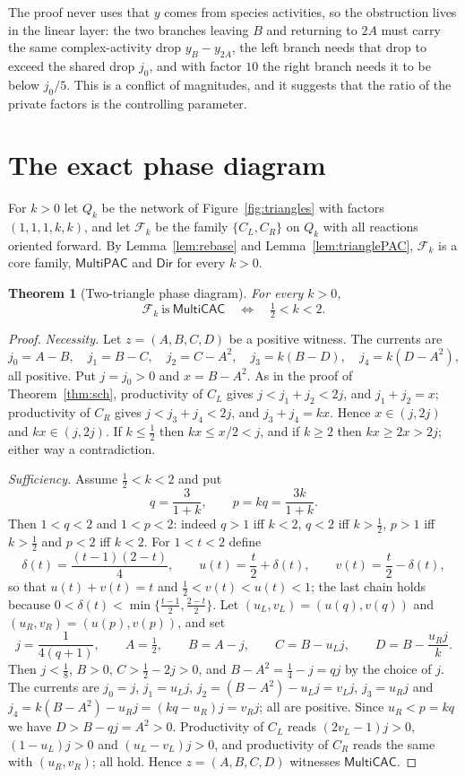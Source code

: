\documentclass[11pt,a4paper]{article}
\theoremstyle{plain}
\newtheorem{theorem}{Theorem}[section]
\theoremstyle{definition}
\theoremstyle{remark}
\newcommand{\cF}{\mathcal{F}}
\newcommand{\MPAC}{\mathsf{MultiPAC}}
\newcommand{\MCAC}{\mathsf{MultiCAC}}
\newcommand{\DIR}{\mathsf{Dir}}
\begin{document}
The proof never uses that $y$ comes from species activities, so the obstruction lives in the linear layer: the two branches leaving $B$ and returning to $2A$ must carry the same complex-activity drop $y_B-y_{2A}$, the left branch needs that drop to exceed the shared drop $j_0$, and with factor $10$ the right branch needs it to be below $j_0/5$. This is a conflict of magnitudes, and it suggests that the ratio of the private factors is the controlling parameter.

\section{The exact phase diagram}\label{sec:phase}

For $k>0$ let $Q_k$ be the network of Figure~\ref{fig:triangles} with factors $(1,1,1,k,k)$, and let $\cF_k$ be the family $\{C_L,C_R\}$ on $Q_k$ with all reactions oriented forward. By Lemma~\ref{lem:rebase} and Lemma~\ref{lem:trianglePAC}, $\cF_k$ is a core family, $\MPAC$ and $\DIR$ for every $k>0$.

\begin{theorem}[Two-triangle phase diagram]\label{thm:phase}
For every $k>0$,
\[
  \cF_k\ \text{is}\ \MCAC \quad\Longleftrightarrow\quad \tfrac12<k<2 .
\]
\end{theorem}

\begin{proof}
\emph{Necessity.} Let $z=(A,B,C,D)$ be a positive witness. The currents are
\[
 j_0=A-B,\quad j_1=B-C,\quad j_2=C-A^2,\quad j_3=k(B-D),\quad j_4=k(D-A^2),
\]
all positive. Put $j=j_0>0$ and $x=B-A^2$. As in the proof of Theorem~\ref{thm:sch}, productivity of $C_L$ gives $j<j_1+j_2<2j$, and $j_1+j_2=x$; productivity of $C_R$ gives $j<j_3+j_4<2j$, and $j_3+j_4=kx$. Hence $x\in(j,2j)$ and $kx\in(j,2j)$. If $k\le\tfrac12$ then $kx\le x/2<j$, and if $k\ge2$ then $kx\ge2x>2j$; either way a contradiction.

\emph{Sufficiency.} Assume $\tfrac12<k<2$ and put
\[
 q=\frac{3}{1+k},\qquad p=kq=\frac{3k}{1+k}.
\]
Then $1<q<2$ and $1<p<2$: indeed $q>1$ iff $k<2$, $q<2$ iff $k>\tfrac12$, $p>1$ iff $k>\tfrac12$ and $p<2$ iff $k<2$. For $1<t<2$ define
\[
 \delta(t)=\frac{(t-1)(2-t)}4,\qquad u(t)=\frac t2+\delta(t),\qquad v(t)=\frac t2-\delta(t),
\]
so that $u(t)+v(t)=t$ and $\tfrac12<v(t)<u(t)<1$; the last chain holds because $0<\delta(t)<\min\{\tfrac{t-1}2,\tfrac{2-t}2\}$. Let $(u_L,v_L)=(u(q),v(q))$ and $(u_R,v_R)=(u(p),v(p))$, and set
\[
 j=\frac{1}{4(q+1)},\qquad A=\tfrac12,\qquad B=A-j,\qquad C=B-u_Lj,\qquad D=B-\frac{u_Rj}{k}.
\]
Then $j<\tfrac18$, $B>0$, $C>\tfrac12-2j>0$, and $B-A^2=\tfrac14-j=qj$ by the choice of $j$. The currents are $j_0=j$, $j_1=u_Lj$, $j_2=(B-A^2)-u_Lj=v_Lj$, $j_3=u_Rj$ and $j_4=k(B-A^2)-u_Rj=(kq-u_R)j=v_Rj$; all are positive. Since $u_R<p=kq$ we have $D>B-qj=A^2>0$. Productivity of $C_L$ reads $(2v_L-1)j>0$, $(1-u_L)j>0$ and $(u_L-v_L)j>0$, and productivity of $C_R$ reads the same with $(u_R,v_R)$; all hold. Hence $z=(A,B,C,D)$ witnesses $\MCAC$.
\end{proof}
\end{document}
